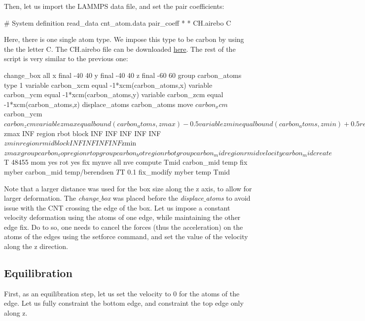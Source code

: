Then, let us import the LAMMPS data file, and set the
pair coefficients:

\begin{lcverbatim}
# System definition
read_data cnt_atom.data
pair_coeff * * CH.airebo C
\end{lcverbatim}

\noindent Here, there is one single atom type. We impose this type
to be carbon by using the the letter C.
The CH.airebo file can be downloaded \href{../../../../../inputs/level1/breaking-a-carbon-nanotube/breakable-bonds/CH.airebo}{here}.
The rest of the script is very similar to the previous one:

\begin{lcverbatim}
change_box all x final -40 40 y final -40 40 z final -60 60
group carbon_atoms type 1
variable carbon_xcm equal -1*xcm(carbon_atoms,x)
variable carbon_ycm equal -1*xcm(carbon_atoms,y)
variable carbon_zcm equal -1*xcm(carbon_atoms,z)
displace_atoms carbon_atoms move ${carbon_xcm} ${carbon_ycm} ${carbon_zcm}
variable zmax equal bound(carbon_atoms,zmax)-0.5
variable zmin equal bound(carbon_atoms,zmin)+0.5
region rtop block INF INF INF INF ${zmax} INF
region rbot block INF INF INF INF INF ${zmin}
region rmid block INF INF INF INF ${zmin} ${zmax}
group carbon_top region rtop
group carbon_bot region rbot
group carbon_mid region rmid
velocity carbon_mid create ${T} 48455 mom yes rot yes
fix mynve all nve
compute Tmid carbon_mid temp
fix myber carbon_mid temp/berendsen ${T} ${T} 0.1
fix_modify myber temp Tmid
\end{lcverbatim}

\noindent Note that a larger distance was used for the box size along 
the z axis, to allow for larger deformation. The \textit{change$\_$box}
was placed before the \textit{displace$\_$atoms} to avoid issue with the 
CNT crossing the edge of the box.
Let us impose a constant velocity deformation using the atoms
of one edge, while maintaining the other edge fix. Do to so,
one needs to cancel the forces (thus the acceleration) on
the atoms of the edges using the setforce command, and set
the value of the velocity along the z direction.

\subsection{Equilibration}

\noindent First, as an equilibration step, let us set the velocity to 0
for the atoms of the edge. Let us fully constraint the bottom edge, 
and constraint the top edge only along z.

